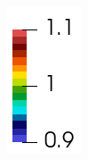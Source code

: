 \begin{figure}[!htbp]
\begin{subfigure}{0.1\textwidth}
    \includegraphics[width=\textwidth]{Chapter5/figures/spallation/colorbar_rf}
  \end{subfigure}
  \hspace{0.1\textwidth}
  \begin{subfigure}{0.25\textwidth}
    \centering

\end{subfigure}
\end{figure}
